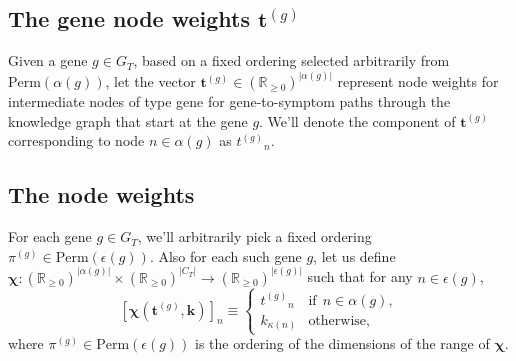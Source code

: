 \documentclass[11pt,notitlepage,english]{article}
\begin{document}
\subsection{The gene node weights ${\boldsymbol t}^{(g)}$}
Given a gene $g \in G_T$, based on a fixed ordering selected
arbitrarily from $\textrm{Perm}(\alpha(g))$, let the vector ${\boldsymbol
  t}^{(g)} \in {({\mathbb R}_{\geq 0})}^{|\alpha(g)|}$ represent node weights
for intermediate nodes of type gene for gene-to-symptom paths through the
knowledge graph that start at the gene $g$.  We'll denote the component of
$\boldsymbol{t}^{(g)}$ corresponding to node $n \in \alpha(g)$ as ${t^{(g)}}_n$.

\subsection{The node weights}
For each gene $g \in G_T$, we'll arbitrarily pick a fixed ordering $\pi^{(g)} \in
\textrm{Perm}(\epsilon(g))$. Also for each such gene $g$, let
us define
$\boldsymbol{\chi}:
       {({\mathbb R}_{\geq 0})}^{|\alpha(g)|} \times {({\mathbb R}_{\geq  0})}^{|C_T|}
        \rightarrow {({\mathbb R}_{\geq 0})}^{|\epsilon(g)|}$ such that for any
$n \in \epsilon(g)$, 
\begin{equation}
  {[\boldsymbol{\chi}({\boldsymbol t}^{(g)}, {\boldsymbol k})]}_n
   \equiv
  \begin{cases}
    {t^{(g)}}_n & \textrm{if} \;\, n \in \alpha(g), \\
    k_{\kappa(n)} & \textrm{otherwise},
  \end{cases}
\end{equation}
where $\pi^{(g)} \in \textrm{Perm}(\epsilon(g))$ is the ordering of the
dimensions of the range of $\boldsymbol{\chi}$.
\end{document}

